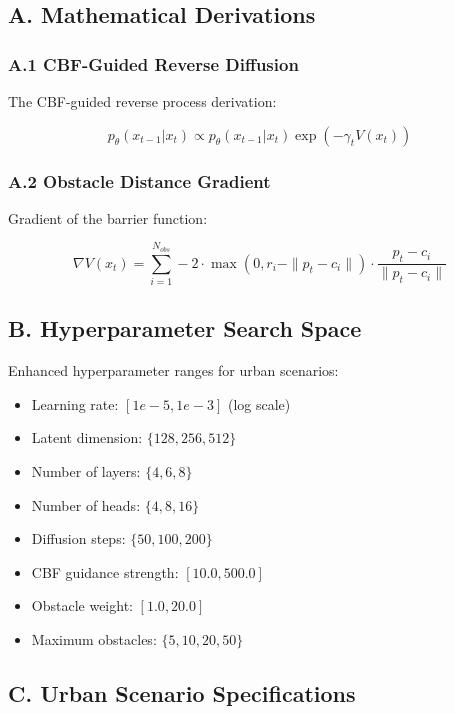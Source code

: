 \documentclass[12pt]{article}
\begin{document}
\subsection*{A. Mathematical Derivations}

\subsubsection*{A.1 CBF-Guided Reverse Diffusion}

The CBF-guided reverse process derivation:

\begin{equation}
p_\theta(x_{t-1}|x_t) \propto p_\theta(x_{t-1}|x_t) \exp(-\gamma_t V(x_t))
\end{equation}

\subsubsection*{A.2 Obstacle Distance Gradient}

Gradient of the barrier function:

\begin{equation}
\nabla V(x_t) = \sum_{i=1}^{N_{obs}} -2 \cdot \max(0, r_i - \|p_t - c_i\|) \cdot \frac{p_t - c_i}{\|p_t - c_i\|}
\end{equation}

\subsection*{B. Hyperparameter Search Space}

Enhanced hyperparameter ranges for urban scenarios:

\begin{itemize}
    \item Learning rate: $[1e-5, 1e-3]$ (log scale)
    \item Latent dimension: $\{128, 256, 512\}$
    \item Number of layers: $\{4, 6, 8\}$
    \item Number of heads: $\{4, 8, 16\}$
    \item Diffusion steps: $\{50, 100, 200\}$
    \item CBF guidance strength: $[10.0, 500.0]$
    \item Obstacle weight: $[1.0, 20.0]$
    \item Maximum obstacles: $\{5, 10, 20, 50\}$
\end{itemize}

\subsection*{C. Urban Scenario Specifications}
\end{document}
